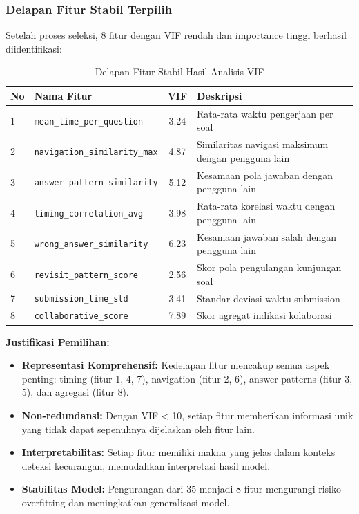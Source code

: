 \subsubsection{Delapan Fitur Stabil Terpilih}
Setelah proses seleksi, 8 fitur dengan VIF rendah dan importance tinggi berhasil diidentifikasi:

\begin{table}[htbp]
\centering
\caption{Delapan Fitur Stabil Hasil Analisis VIF}
\label{tabel:fiturStabil}
\begin{tabular}{|l|l|c|p{5cm}|}
\hline
\textbf{No} & \textbf{Nama Fitur} & \textbf{VIF} & \textbf{Deskripsi} \\
\hline
1 & \texttt{mean\_time\_per\_question} & 3.24 & Rata-rata waktu pengerjaan per soal \\
\hline
2 & \texttt{navigation\_similarity\_max} & 4.87 & Similaritas navigasi maksimum dengan pengguna lain \\
\hline
3 & \texttt{answer\_pattern\_similarity} & 5.12 & Kesamaan pola jawaban dengan pengguna lain \\
\hline
4 & \texttt{timing\_correlation\_avg} & 3.98 & Rata-rata korelasi waktu dengan pengguna lain \\
\hline
5 & \texttt{wrong\_answer\_similarity} & 6.23 & Kesamaan jawaban salah dengan pengguna lain \\
\hline
6 & \texttt{revisit\_pattern\_score} & 2.56 & Skor pola pengulangan kunjungan soal \\
\hline
7 & \texttt{submission\_time\_std} & 3.41 & Standar deviasi waktu submission \\
\hline
8 & \texttt{collaborative\_score} & 7.89 & Skor agregat indikasi kolaborasi \\
\hline
\end{tabular}
\end{table}

\textbf{Justifikasi Pemilihan:}
\begin{itemize}
    \item \textbf{Representasi Komprehensif:} Kedelapan fitur mencakup semua aspek penting: timing (fitur 1, 4, 7), navigation (fitur 2, 6), answer patterns (fitur 3, 5), dan agregasi (fitur 8).
    \item \textbf{Non-redundansi:} Dengan VIF < 10, setiap fitur memberikan informasi unik yang tidak dapat sepenuhnya dijelaskan oleh fitur lain.
    \item \textbf{Interpretabilitas:} Setiap fitur memiliki makna yang jelas dalam konteks deteksi kecurangan, memudahkan interpretasi hasil model.
    \item \textbf{Stabilitas Model:} Pengurangan dari 35 menjadi 8 fitur mengurangi risiko overfitting dan meningkatkan generalisasi model.
\end{itemize}

